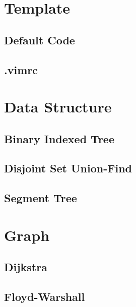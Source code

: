 \documentclass[twocolumn]{article}
\begin{document}
\setlength\parindent{0pt}

\tableofcontents

\pagestyle{fancy}
\fancyfoot{}
\fancyhead[R]{\thepage}

\section{Template}

\subsection{Default Code}


\subsection{.vimrc}


\section{Data Structure}

\subsection{Binary Indexed Tree}


\subsection{Disjoint Set Union-Find}


\subsection{Segment Tree}


\section{Graph}

\subsection{Dijkstra}


\subsection{Floyd-Warshall}

\end{document}
